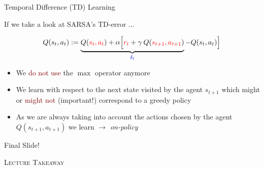 \documentclass{beamer}
\newenvironment{takeaway}[1]{%
	\definecolor{shadecolor}{gray}{0.9}%
		\begin{shaded}{\color{skymagenta}\noindent\textsc{#1}}\\%
		}{%
		\end{shaded}%
}
\begin{document}
\begin{frame}{Temporal Difference (TD) Learning}

		If we take a look at SARSA's TD-error ...

		\begin{align*}
			Q(s_t,a_t):=\underbrace{Q(\textcolor{red}{s_t,a_t}) + \alpha\Big[\textcolor{red}{r_t} + \gamma \: Q(\textcolor{red}{s_{t+1},a_{t+1}})}_{\textcolor{blue}{\delta_t}} - Q(s_t, a_t) \Big]
		\end{align*}


		\begin{itemize}
			\item We \textcolor{Maroon}{do not use} the $\max$ operator anymore
			\item We learn with respect to the next state visited by the agent $s_{t+1}$ which might or \textcolor{Maroon}{might not} (important!) correspond to a greedy policy
			\item As we are always taking into account the actions chosen by the agent $Q(s_{t+1}, a_{t+1})$ we learn $\rightarrow$ \textit{on-policy}
		\end{itemize}

\end{frame}




\begin{frame}{Final Slide!}
	\begin{takeaway}{Lecture Takeaway}
	\end{takeaway}
\end{frame}

\end{document}
